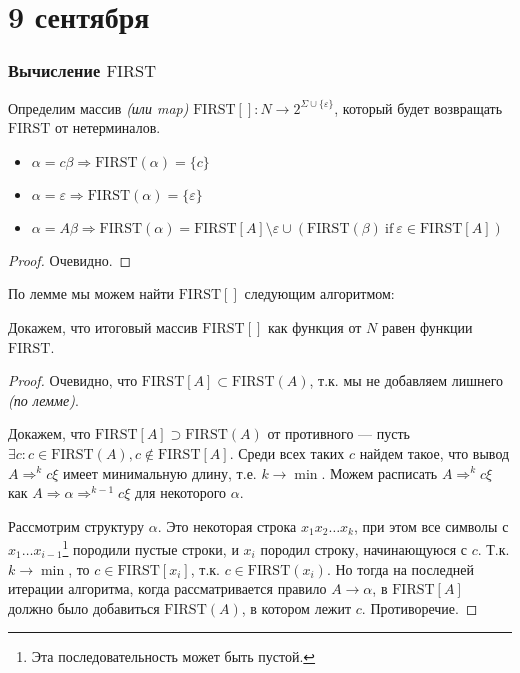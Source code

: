 \chapter{9 сентября}

\subsection{Вычисление \(\mathrm{FIRST}\)}

Определим массив \textit{(или map)} \(\mathrm{FIRST[]} : N \to 2^{\Sigma \cup \{\varepsilon\}}\), который будет возвращать \(\mathrm{FIRST}\) от нетерминалов.

\begin{lemma}\itemfix
    \begin{itemize}
        \item \(\alpha = c\beta \Rightarrow \mathrm{FIRST}(\alpha) = \{c\}\)
        \item \(\alpha = \varepsilon \Rightarrow \mathrm{FIRST}(\alpha) = \{\varepsilon\}\)
        \item \(\alpha = A\beta \Rightarrow \mathrm{FIRST}(\alpha) = \mathrm{FIRST}[A] \setminus \varepsilon \cup (\mathrm{FIRST}(\beta)\ \mathrm{if}\ \varepsilon \in \mathrm{FIRST}[A])\)
    \end{itemize}
\end{lemma}
\begin{proof}
    Очевидно.
\end{proof}

По лемме мы можем найти \(\mathrm{FIRST}[]\) следующим алгоритмом:


Докажем, что итоговый массив \(\mathrm{FIRST}[]\) как функция от \(N\) равен функции \(\mathrm{FIRST}\).
\begin{proof}
    Очевидно, что \(\mathrm{FIRST}[A] \subset \mathrm{FIRST}(A)\), т.к. мы не добавляем лишнего \textit{(по лемме)}.

    Докажем, что \(\mathrm{FIRST}[A] \supset \mathrm{FIRST}(A)\) от противного --- пусть \(\exists c : c \in \mathrm{FIRST}(A), c \notin \mathrm{FIRST}[A]\). Среди всех таких \(c\) найдем такое, что вывод \(A \Rightarrow^k c\xi\) имеет минимальную длину, т.е. \(k \to \min\). Можем расписать \(A \Rightarrow^k c\xi\) как \(A \Rightarrow \alpha \Rightarrow^{k - 1} c\xi\) для некоторого \(\alpha\).

    Рассмотрим структуру \(\alpha\). Это некоторая строка \(x_1 x_2 \dots x_k\), при этом все символы с \(x_1\dots x_{i - 1}\)\footnote{Эта последовательность может быть пустой.} породили пустые строки, и \(x_i\) породил строку, начинающуюся с \(c\). Т.к. \(k \to \min\), то \(c \in \mathrm{FIRST}[x_i]\), т.к. \(c \in \mathrm{FIRST}(x_i)\). Но тогда на последней итерации алгоритма, когда рассматривается правило \(A \to \alpha\), в \(\mathrm{FIRST}[A]\) должно было добавиться \(\mathrm{FIRST}(A)\), в котором лежит \(c\). Противоречие.
\end{proof}

